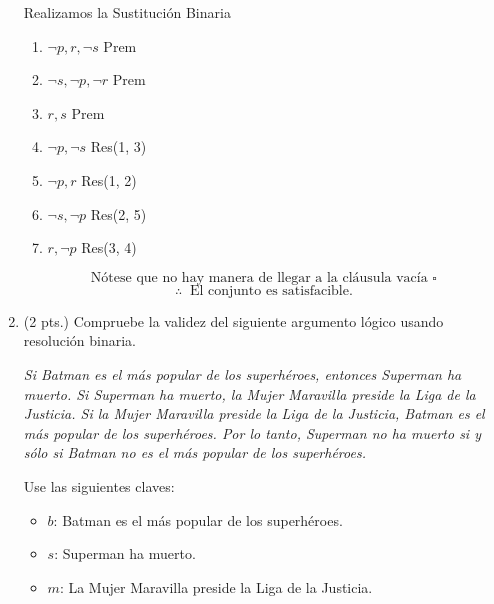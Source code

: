 \documentclass[12pt,letterpaper]{article}
\begin{document}
\begin{enumerate}
    Realizamos la Sustituci\'{o}n Binaria
  
    \begin{enumerate}[label=\arabic*.]
    \item $\neg p, r, \neg s$ \hspace{1cm} Prem
    \item $\neg s, \neg p, \neg r$ \hspace{0.7cm} Prem
    \item $r, s$ \hspace{2cm} Prem
    \item $\neg p, \neg s$ \hspace{1.4cm} Res(1, 3)
    \item $\neg p, r$ \hspace{1.7cm} Res(1, 2)
    \item $\neg s, \neg p$ \hspace{1.4cm} Res(2, 5)
    \item $r, \neg p$ \hspace{1.7cm} Res(3, 4)
    \end{enumerate}
    \[
    \text{N\'{o}tese que no hay manera de llegar a la cl\'{a}usula vac\'{i}a } \square
    \]
    \[
    \therefore \;\; \text{El conjunto es satisfacible.}
    \]
    
  \item (2 pts.) Compruebe la validez del siguiente argumento lógico usando resolución binaria.
    
    \textit{Si Batman es el más popular de los superhéroes, entonces Superman ha muerto. Si Superman ha muerto, la Mujer Maravilla preside la Liga de la Justicia. Si la Mujer Maravilla preside la Liga de la Justicia, Batman es el más popular de los superhéroes. Por lo tanto, Superman no ha muerto si y sólo si Batman no es el más popular de los superhéroes.}
    
    Use las siguientes claves:
    \begin{itemize}[label=--] 
        \item $b$: Batman es el más popular de los superhéroes.
        \item $s$: Superman ha muerto.
        \item $m$: La Mujer Maravilla preside la Liga de la Justicia.
    \end{itemize}

    \bigskip


\end{enumerate}
\end{document}
